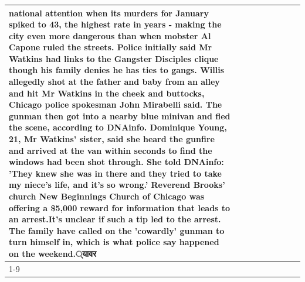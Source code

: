 \begin{table}[H]
\begin{tabular}{lllrlllll}
national attention when its murders for January spiked to 43, the highest rate in years - making the city even more dangerous than when mobster Al Capone ruled the streets. Police initially said Mr Watkins had links to the Gangster Disciples clique though his family denies he has ties to gangs. Willis allegedly shot at the father and baby from an alley and hit Mr Watkins in the cheek and buttocks, Chicago police spokesman John Mirabelli said. The gunman then got into a nearby blue minivan and fled the scene, according to DNAinfo. Dominique Young, 21, Mr Watkins' sister, said she heard the gunfire and arrived at the van within seconds to find the windows had been shot through. She told DNAinfo: 'They knew she was in there and they tried to take my niece's life, and it's so wrong.' Reverend Brooks' church New Beginnings Church of Chicago was offering a \$5,000 reward for information that leads to an arrest.It's unclear if such a tip led to the arrest. The family have called on the 'cowardly' gunman to turn himself in, which is what police say happened on the weekend.्यावर \\
\cline{1-9}

\end{tabular}
\end{table}
